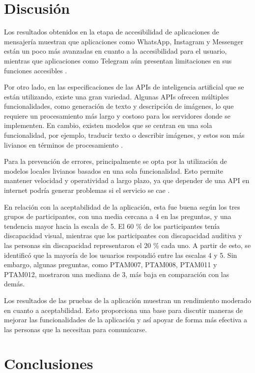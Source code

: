 \documentclass[lettersize,journal]{IEEEtran}
\begin{document}
\section{Discusión}
\noindent Los resultados obtenidos en la etapa de accesibilidad de aplicaciones de mensajería muestran que aplicaciones como WhatsApp, Instagram y Messenger están un poco más avanzadas en cuanto a la accesibilidad para el usuario, mientras que aplicaciones como Telegram aún presentan limitaciones en sus funciones accesibles \cite{telegram2025}. 

\noindent Por otro lado, en las especificaciones de las APIs de inteligencia artificial que se están utilizando, existe una gran variedad. Algunas APIs ofrecen múltiples funcionalidades, como generación de texto y descripción de imágenes, lo que requiere un procesamiento más largo y costoso para los servidores donde se implementen. En cambio, existen modelos que se centran en una sola funcionalidad, por ejemplo, traducir texto o describir imágenes, y estos son más livianos en términos de procesamiento \cite{Varoquaux2025}.

\noindent Para la prevención de errores, principalmente se opta por la utilización de modelos locales livianos basados en una sola funcionalidad. Esto permite mantener velocidad y operatividad a largo plazo, ya que depender de una API en internet podría generar problemas si el servicio se cae \cite{Yugopuspito2024}.

\noindent En relación con la aceptabilidad de la aplicación, esta fue buena según los tres grupos de participantes, con una media cercana a 4 en las preguntas, y una tendencia mayor hacia la escala de 5. El 60 \% de los participantes tenía discapacidad visual, mientras que los participantes con discapacidad auditiva y las personas sin discapacidad representaron el 20 \% cada uno. A partir de esto, se identificó que la mayoría de los usuarios respondió entre las escalas 4 y 5. Sin embargo, algunas preguntas, como PTAM007, PTAM008, PTAM011 y PTAM012, mostraron una mediana de 3, más baja en comparación con las demás.

\noindent Los resultados de las pruebas de la aplicación muestran un rendimiento moderado en cuanto a aceptabilidad. Esto proporciona una base para discutir maneras de mejorar las funcionalidades de la aplicación y así apoyar de forma más efectiva a las personas que la necesitan para comunicarse.

\section{Conclusiones}
\end{document}
